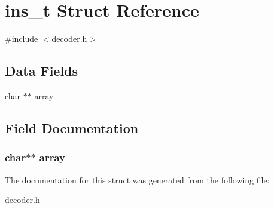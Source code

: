 \hypertarget{structins__t}{}\section{ins\+\_\+t Struct Reference}
\label{structins__t}


{\ttfamily \#include $<$decoder.\+h$>$}

\subsection*{Data Fields}
\begin{DoxyCompactItemize}
\item 
char $\ast$$\ast$ \hyperlink{structins__t_a89d118e1ef729da476303ec55809974c}{array}
\end{DoxyCompactItemize}


\subsection{Field Documentation}
\hypertarget{structins__t_a89d118e1ef729da476303ec55809974c}{}
\subsubsection[{array}]{\setlength{\rightskip}{0pt plus 5cm}char$\ast$$\ast$ array}\label{structins__t_a89d118e1ef729da476303ec55809974c}


The documentation for this struct was generated from the following file\+:\begin{DoxyCompactItemize}
\item 
\hyperlink{decoder_8h}{decoder.\+h}\end{DoxyCompactItemize}
